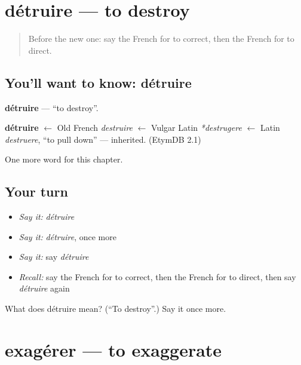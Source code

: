 \section[détruire]{détruire — to destroy}

\label{lesson:FR-C182-detruire}



\begin{quote}
Before the new one: say the French for to correct, then the French for to direct.
\end{quote}

\subsection*{You'll want to know: détruire}
\textbf{détruire} — \textquotedblleft{}to destroy\textquotedblright{}.

\begin{cousinweb}
\textbf{détruire} $\leftarrow$ Old French \emph{destruire} $\leftarrow$ Vulgar Latin \emph{*destrugere} $\leftarrow$ Latin \emph{destruere}, \textquotedblleft{}to pull down\textquotedblright{} — inherited. (EtymDB 2.1)
\end{cousinweb}

\begin{grammarlens}[title={What you've built}]
One more word for this chapter.
\end{grammarlens}

\subsection*{Your turn}
\begin{itemize}
\raggedright
  \item \emph{Say it:} \emph{détruire}
  \item \emph{Say it:} \emph{détruire}, once more
  \item \emph{Say it:} say \emph{détruire}
  \item \emph{Recall:} say the French for to correct, then the French for to direct, then say \emph{détruire} again
\end{itemize}

\begin{tcolorbox}[breakable,colback=teal!4,colframe=teal!35!black,title={Before you move on}]
What does détruire mean? (\textquotedblleft{}To destroy\textquotedblright{}.) Say it once more.
\end{tcolorbox}
\section[exagérer]{exagérer — to exaggerate}


